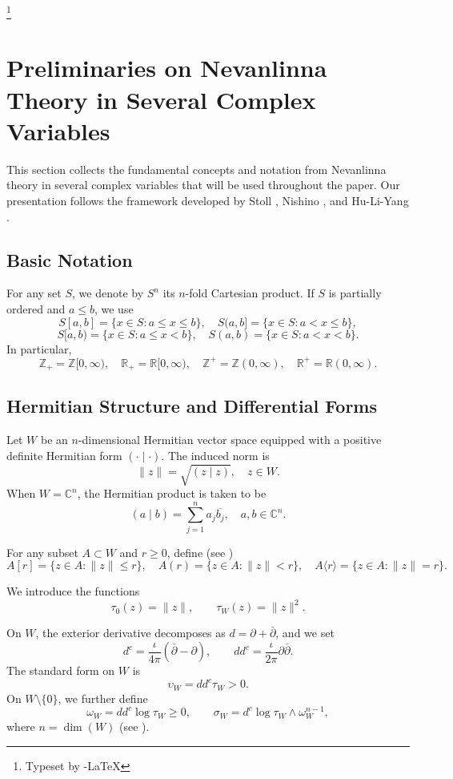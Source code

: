\documentclass[11pt,reqno]{amsart}
\numberwithin{equation}{section}
\begin{document}
\thanks{Typeset by \AmS -\LaTeX}
\maketitle


\section{{\bf Preliminaries on Nevanlinna Theory in Several Complex Variables}}

This section collects the fundamental concepts and notation from Nevanlinna theory in several complex variables that will be used throughout the paper. Our presentation follows the framework developed by Stoll \cite{Stoll-1974}, Nishino \cite{Nishino-2001}, and Hu-Li-Yang \cite{Hu-Li-Yang-2003}.

\subsection*{Basic Notation}

For any set $S$, we denote by $S^n$ its $n$-fold Cartesian product.  
If $S$ is partially ordered and $a \le b$, we use
\[
S[a,b]=\{x\in S:a\le x\le b\}, \quad
S(a,b]=\{x\in S:a<x\le b\},
\]
\[
S[a,b)=\{x\in S:a\le x<b\}, \quad
S(a,b)=\{x\in S:a<x<b\}.
\]
In particular,
\[
\mathbb{Z}_+ = \mathbb{Z}[0,\infty), \quad
\mathbb{R}_+ = \mathbb{R}[0,\infty), \quad
\mathbb{Z}^+ = \mathbb{Z}(0,\infty), \quad
\mathbb{R}^+ = \mathbb{R}(0,\infty).
\]

\subsection*{Hermitian Structure and Differential Forms}

Let $W$ be an $n$-dimensional Hermitian vector space equipped with a positive definite Hermitian form $(\cdot \mid \cdot)$. The induced norm is
\[
\|z\| = \sqrt{(z \mid z)}, \quad z \in W.
\]
When $W=\mathbb{C}^n$, the Hermitian product is taken to be
\[
(a \mid b)=\sum_{j=1}^n a_j \overline{b_j},
\quad a,b\in\mathbb{C}^n.
\]

For any subset $A\subset W$ and $r\ge0$, define (see \cite[pp. 6]{Stoll-1974})
\[
A[r]=\{z\in A:\|z\|\le r\},\quad
A(r)=\{z\in A:\|z\|<r\},\quad
A\langle r\rangle=\{z\in A:\|z\|=r\}.
\]

We introduce the functions
\[
\tau_0(z)=\|z\|,\qquad \tau_W(z)=\|z\|^2.
\]

On $W$, the exterior derivative decomposes as $d=\partial+\bar{\partial}$, and we set
\[
d^c=\frac{\iota}{4\pi}(\bar{\partial}-\partial), \qquad
dd^c=\frac{\iota}{2\pi}\partial\bar{\partial}.
\]
The standard  form on $W$ is
\[
\upsilon_W = dd^c \tau_W >0.
\]
On $W\setminus\{0\}$, we further define
\[
\omega_W = dd^c \log \tau_W \ge 0, \qquad
\sigma_W = d^c\log\tau_W \wedge \omega_W^{n-1},
\]
where $n=\dim(W)$ (see \cite[pp. 6]{Stoll-1974}).
\end{document}
